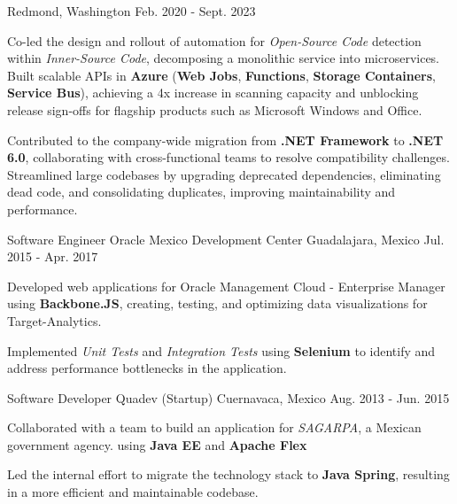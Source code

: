 \begin{cventries}
    {Redmond, Washington} %
    {Feb. 2020 - Sept. 2023} %
    {
      \begin{cvitems} %
        \item {
            Co-led the design and rollout of automation for \textit{Open-Source Code} detection within \textit{Inner-Source Code}, decomposing a monolithic service into microservices. Built scalable APIs in \textbf{Azure} (\textbf{Web Jobs}, \textbf{Functions}, \textbf{Storage Containers}, \textbf{Service Bus}), achieving a 4x increase in scanning capacity and unblocking release sign-offs for flagship products such as Microsoft Windows and Office.
        }
        \item {
            Contributed to the company-wide migration from \textbf{.NET Framework} to \textbf{.NET 6.0}, collaborating with cross-functional teams to resolve compatibility challenges. Streamlined large codebases by upgrading deprecated dependencies, eliminating dead code, and consolidating duplicates, improving maintainability and performance.
        }
      \end{cvitems}
    }

  \cventry
    {Software Engineer} %
    {Oracle Mexico Development Center} %
    {Guadalajara, Mexico} %
    {Jul. 2015 - Apr. 2017} %
    {
        \begin{cvitems}
          \item {Developed web applications for Oracle Management Cloud - Enterprise Manager using \textbf{Backbone.JS},
          creating, testing, and optimizing data visualizations for Target-Analytics.}
          \item {Implemented \textit{Unit Tests} and \textit{Integration Tests} using \textbf{Selenium}
          to identify and address performance bottlenecks in the application.}
        \end{cvitems}
    }

\cventry
{Software Developer} %
{Quadev (Startup)} %
{Cuernavaca, Mexico} %
{Aug. 2013 - Jun. 2015} %
{
    \begin{cvitems}
      \item {Collaborated with a team to build an application for \textit{SAGARPA}, a Mexican government agency. using \textbf{Java EE} and \textbf{Apache Flex}}
      \item {Led the internal effort to migrate the technology stack to \textbf{Java Spring},
      resulting in a more efficient and maintainable codebase.}
    \end{cvitems}
}

\end{cventries}
